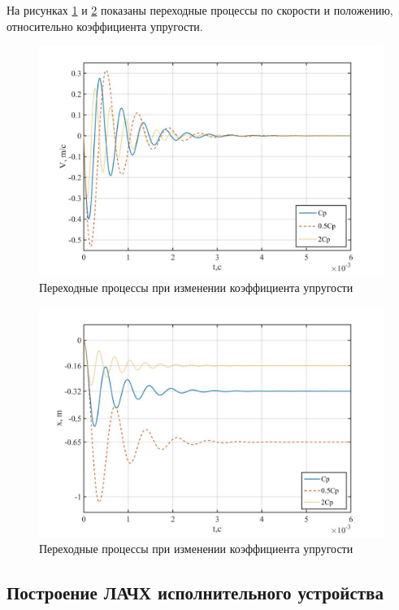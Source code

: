 \documentclass[a4paper, 12pt]{article}
\begin{document}
На рисунках \ref{Cp_V} и \ref{Cp_x} показаны переходные процессы по скорости и положению, относительно коэффициента упругости.

\begin{figure}[h!]
	\centering
	\includegraphics[width = 0.65\textheight]{data/Cp_V}
	\caption{Переходные процессы при изменении коэффициента упругости}
	\label{Cp_V}
\end{figure}

\newpage

\begin{figure}[h!]
	\centering
	\includegraphics[width = 0.65\textheight]{data/Cp_x}
	\caption{Переходные процессы при изменении коэффициента упругости}
	\label{Cp_x}
\end{figure}

\newpage

\begin{center}
	\section{Построение ЛАЧХ исполнительного устройства}
\end{center}\par
\end{document}
